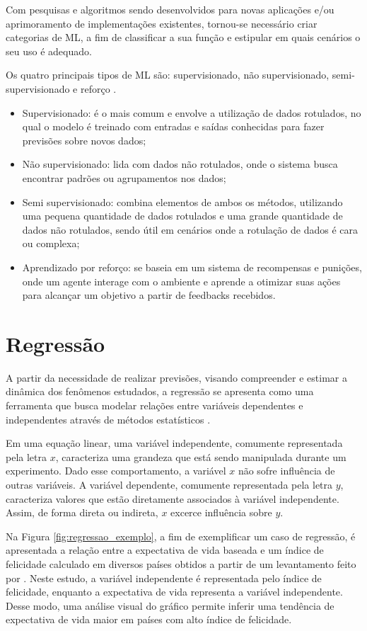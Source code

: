 Com pesquisas e algoritmos sendo desenvolvidos para novas aplicações e/ou aprimoramento de implementações existentes, tornou-se necessário criar categorias de ML, a fim de classificar a sua função e estipular em quais cenários o seu uso é adequado.

Os quatro principais tipos de ML são: supervisionado, não supervisionado, semi-supervisionado e reforço \cite{saravanan2018}. 

\begin{itemize}
    \item Supervisionado: é o mais comum e envolve a utilização de dados rotulados, no qual o modelo é treinado com entradas e saídas conhecidas para fazer previsões sobre novos dados;
    \item Não supervisionado: lida com dados não rotulados, onde o sistema busca encontrar padrões ou agrupamentos nos dados;
    \item Semi supervisionado: combina elementos de ambos os métodos, utilizando uma pequena quantidade de dados rotulados e uma grande quantidade de dados não rotulados, sendo útil em cenários onde a rotulação de dados é cara ou complexa;
    \item Aprendizado por reforço: se baseia em um sistema de recompensas e punições, onde um agente interage com o ambiente e aprende a otimizar suas ações para alcançar um objetivo a partir de feedbacks recebidos.
\end{itemize}

\section{Regressão}

A partir da necessidade de realizar previsões, visando compreender e estimar a dinâmica dos fenômenos estudados, a regressão se apresenta como uma ferramenta que busca modelar relações entre variáveis dependentes e independentes através de métodos estatísticos \cite{soto2013}.

Em uma equação linear, uma variável independente, comumente representada pela letra $x$, caracteriza uma grandeza que está sendo manipulada durante um experimento. Dado esse comportamento, a variável $x$ não sofre influência de outras variáveis. A variável dependente, comumente representada pela letra $y$, caracteriza valores que estão diretamente associados à variável independente. Assim, de forma direta ou indireta, $x$ excerce influência sobre $y$.

Na Figura \ref{fig:regressao_exemplo}, a fim de exemplificar um caso de regressão, é apresentada a relação entre a expectativa de vida baseada e um índice de felicidade calculado em diversos países obtidos a partir de um levantamento feito por \cite{helliwell2020}. Neste estudo, a variável independente é representada pelo índice de felicidade, enquanto a expectativa de vida representa a variável independente. Desse modo, uma análise visual do gráfico permite inferir uma tendência de expectativa de vida maior em países com alto índice de felicidade. 

